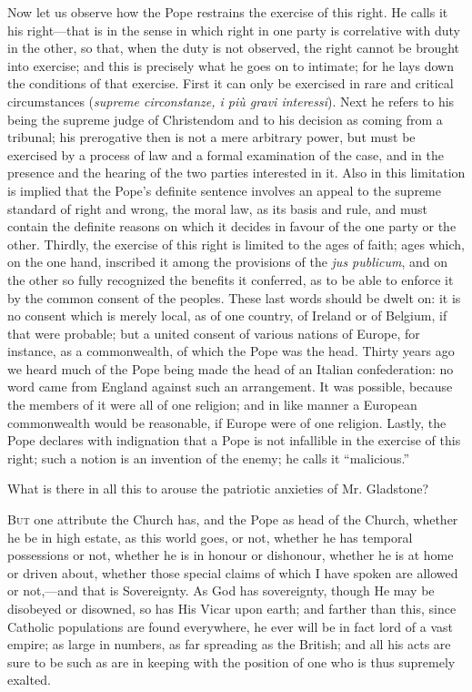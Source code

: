 Now let us observe how the Pope restrains the exercise of this right.
He calls it his right—that is in the sense in which right in one party
is correlative with duty in the other, so that, when the duty is not
observed, the right cannot be brought into exercise; and this is
precisely what he goes on to intimate; for he lays down the conditions
of that exercise. First it can only be exercised in rare and critical
circumstances (\emph{supreme circonstanze, i più gravi interessi}).
Next he refers to his being the supreme judge of Christendom and to his
decision as coming from a tribunal; his prerogative then is not a mere
arbitrary power, but must be exercised by a process of law and a formal
examination of the case, and in the presence and the hearing of the two
parties interested in it. Also in this limitation is implied that the
Pope's definite sentence involves an appeal to the supreme standard of
right and wrong, the moral law, as its basis and rule, and must contain
the definite reasons on which it decides in favour of the one party or
the other. Thirdly, the exercise of this right is limited to the ages of
faith; ages which, on the one hand, inscribed it among the provisions of
the \emph{jus publicum}, and on the other so fully recognized the
benefits it conferred, as to be able to enforce it by the common consent
of the peoples. These last words should be dwelt on: it is no consent
which is merely local, as of one country, of Ireland or of
Belgium, if that were probable; but a united consent of various nations
of Europe, for instance, as a commonwealth, of which the Pope was the
head. Thirty years ago we heard much of the Pope being made the head of
an Italian confederation: no word came from England against such an
arrangement. It was possible, because the members of it were all of one
religion; and in like manner a European commonwealth would be
reasonable, if Europe were of one religion. Lastly, the Pope declares
with indignation that a Pope is not infallible in the exercise of this
right; such a notion is an invention of the enemy; he calls it
``malicious.''

What is there in all this to arouse the patriotic anxieties of Mr.
Gladstone?


B\textsc{ut} one attribute the Church has, and the Pope as head of the
Church, whether he be in high estate, as this world goes, or not,
whether he has temporal possessions or not, whether he is in honour or
dishonour, whether he is at home or driven about, whether those special
claims of which I have spoken are allowed or not,—and that is
Sovereignty. As God has sovereignty, though He may be disobeyed or
disowned, so has His Vicar upon earth; and farther than this, since
Catholic populations are found everywhere, he ever will be in fact lord
of a vast empire; as large in numbers, as far spreading as the British;
and all his acts are sure to be such as are in keeping with the position
of one who is thus supremely exalted.

